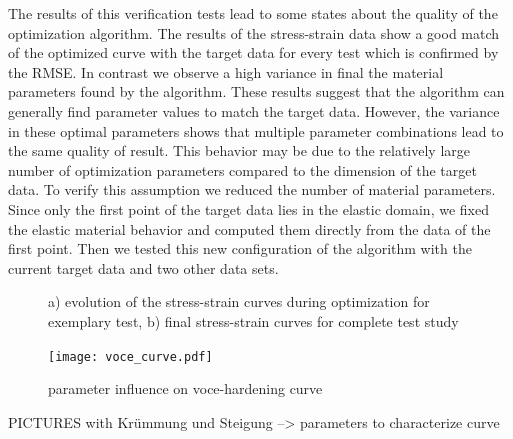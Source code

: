     The results of this verification tests lead to some states about the quality of the optimization algorithm. The results of the stress-strain data show a good match of the optimized curve with the target data for every test which is confirmed by the RMSE. In contrast we observe a high variance in final the material parameters found by the algorithm. These results suggest that the algorithm can generally find parameter values to match the target data. However, the variance in these optimal parameters shows that multiple parameter combinations lead to the same quality of result. This behavior may be due to the relatively large number of optimization parameters compared to the dimension of the target data. To verify this assumption we reduced the number of material parameters. Since only the first point of the target data lies in the elastic domain, we fixed the elastic material behavior and computed them directly from the data of the first point. Then we tested this new configuration of the algorithm with the current target data and two other data sets.


    \begin{figure}[H]
        \centering
        \caption{a) evolution of the stress-strain curves during optimization for exemplary test, b) final stress-strain curves for complete test study}
        \label{fig:complete}
    \end{figure}


   
   \begin{figure}
		\centering
        \texttt{[image: voce\_curve.pdf]}
		\caption{parameter influence on voce-hardening curve}
		\label{fig:Parameter influence on VOCE-hardening curve}
	\end{figure}
    PICTURES with Krümmung und Steigung --> parameters to characterize curve

